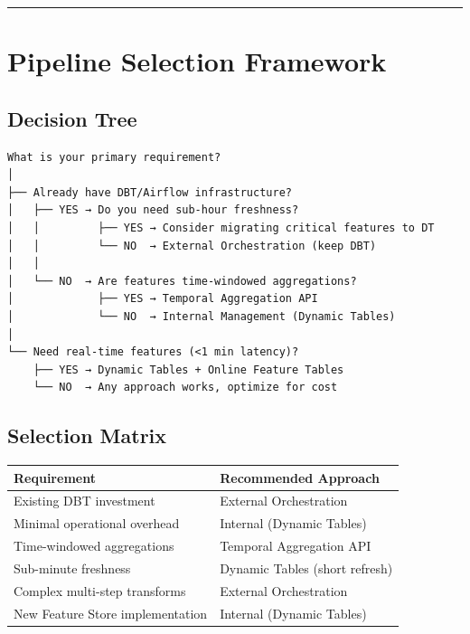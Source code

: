 \documentclass[
  letterpaper,
  DIV=11,
  numbers=noendperiod]{scrreprt}
\begin{document}
\begin{center}\rule{0.5\linewidth}{0.5pt}\end{center}

\hypertarget{sec-selection}{%
\section{Pipeline Selection Framework}\label{sec-selection}}

\hypertarget{decision-tree}{%
\subsection{Decision Tree}\label{decision-tree}}

\begin{verbatim}
What is your primary requirement?
│
├── Already have DBT/Airflow infrastructure?
│   ├── YES → Do you need sub-hour freshness?
│   │         ├── YES → Consider migrating critical features to DT
│   │         └── NO  → External Orchestration (keep DBT)
│   │
│   └── NO  → Are features time-windowed aggregations?
│             ├── YES → Temporal Aggregation API
│             └── NO  → Internal Management (Dynamic Tables)
│
└── Need real-time features (<1 min latency)?
    ├── YES → Dynamic Tables + Online Feature Tables
    └── NO  → Any approach works, optimize for cost
\end{verbatim}

\hypertarget{selection-matrix}{%
\subsection{Selection Matrix}\label{selection-matrix}}

\begin{longtable}[]{@{}ll@{}}
\toprule\noalign{}
Requirement & Recommended Approach \\
\midrule\noalign{}
\endhead
\bottomrule\noalign{}
\endlastfoot
Existing DBT investment & External Orchestration \\
Minimal operational overhead & Internal (Dynamic Tables) \\
Time-windowed aggregations & Temporal Aggregation API \\
Sub-minute freshness & Dynamic Tables (short refresh) \\
Complex multi-step transforms & External Orchestration \\
New Feature Store implementation & Internal (Dynamic Tables) \\
\end{longtable}
\end{document}
